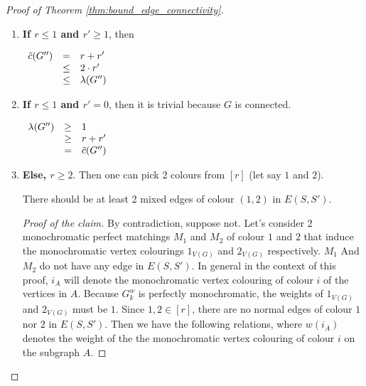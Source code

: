 \begin{proof}[Proof of Theorem \ref{thm:bound_edge_connectivity}]
\begin{enumerate}
            \begin{enumerate}
                \item 
                    \textbf{If $r \leq 1$ and $r' \geq 1$}, then 
                    
                    \begin{center}
                        $\begin{array}{l c l}
                            \Tilde{c}(G'')  & =    & r + r' \\
                                            & \leq & 2 \cdot r' \\
                                            & \leq & \lambda(G'')
                        \end{array}$
                    \end{center}
                    
                \item 
                    \textbf{If $r \leq 1$ and $r' = 0$}, then it is trivial because $G$ is connected.
                    
                    \begin{center}
                        $\begin{array}{lcl}
                            \lambda(G'')  & \geq & 1 \\
                                          & \geq & r + r' \\
                                          & =    & \Tilde{c}(G'')
                        \end{array}$
                    \end{center}
                    
                \item
                    \textbf{Else, $r \geq 2$}. Then one can pick 2 colours from $[r]$ (let say $1$ and $2$).
                    
                    \begin{claim}
                        There should be at least 2 mixed edges of colour $(1, 2)$ in $E(S, S')$.
                    \end{claim}
                    
                    \begin{proof}[Proof of the claim]
                        By contradiction, suppose not. Let's consider 2 monochromatic perfect matchings $M_1$ and $M_2$ of colour $1$ and $2$ that induce the monochromatic vertex colourings $1_{V(G)}$ and $2_{V(G)}$ respectively. $M_1$ And $M_2$ do not have any edge in $E(S, S')$. In general in the context of this proof, $i_A$ will denote the monochromatic vertex colouring of colour $i$ of the vertices in $A$. Because $G_k^w$ is perfectly monochromatic, the weights of $1_{V(G)}$ and $2_{V(G)}$ must be $1$. Since $1, 2 \in [r]$, there are no normal edges of colour $1$ nor $2$ in $E(S, S')$. Then we have the following relations, where $w(i_A)$ denotes the weight of the the monochromatic vertex colouring of colour $i$ on the subgraph $A$.
                        

\end{proof}
\end{enumerate}
\end{enumerate}
\end{proof}
